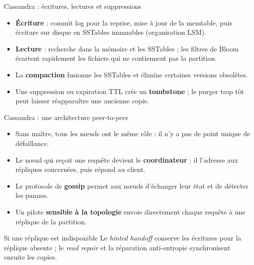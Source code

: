 \begin{frame}{Cassandra : écritures, lectures et suppressions}
    \begin{itemize}
        \item \textbf{Écriture} : commit log pour la reprise, mise à jour de la
              memtable, puis écriture sur disque en SSTables immuables
              (organisation LSM).
        \item \textbf{Lecture} : recherche dans la mémoire et les SSTables ; les
              filtres de Bloom écartent rapidement les fichiers qui ne
              contiennent pas la partition.
        \item La \textbf{compaction} fusionne les SSTables et élimine certaines
              versions obsolètes.
        \item Une suppression ou expiration TTL crée un \textbf{tombstone} ; le
              purger trop tôt peut laisser réapparaître une ancienne copie.
    \end{itemize}

\end{frame}

\begin{frame}{Cassandra : une architecture peer-to-peer}
    \begin{itemize}
        \item Sans maître, tous les nœuds ont le même rôle : il n'y a pas de
              point unique de défaillance.
        \item Le nœud qui reçoit une requête devient le \textbf{coordinateur} :
              il l'adresse aux répliques concernées, puis répond au client.
        \item Le protocole de \textbf{gossip} permet aux nœuds d'échanger leur
              état et de détecter les pannes.
        \item Un pilote \textbf{sensible à la topologie} envoie directement
              chaque requête à une réplique de la partition.
    \end{itemize}

    \begin{examplebox}{Si une réplique est indisponible}
        Le \textit{hinted handoff} conserve les écritures pour la réplique
        absente ; le \textit{read repair} et la réparation anti-entropie
        synchronisent ensuite les copies.
    \end{examplebox}
\end{frame}

